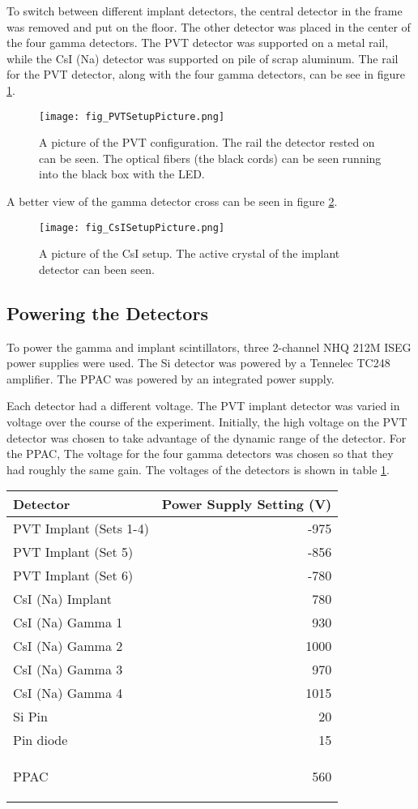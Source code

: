 \documentclass[../MaxHughesThesis.tex]{subfiles}
\begin{document}
To switch between different implant detectors, the central detector in the frame was removed and put on the floor.
The other detector was placed in the center of the four gamma detectors.
The PVT detector was supported on a metal rail, while the CsI (Na) detector was supported on pile of scrap aluminum.
The rail for the PVT detector, along with the four gamma detectors,  can be see in figure \ref{fig:PVTPicture}.

\begin{figure}
	\centerline{\texttt{[image: fig\_PVTSetupPicture.png]}}
	\caption{A picture of the PVT configuration. 
		 The rail the detector rested on can be seen.
		 The optical fibers (the black cords) can be seen running into the black box with the LED.
		 }
	\label{fig:PVTPicture}
\end{figure}
A better view of the gamma detector cross can be seen in figure \ref{fig:CsIPicture}.

\begin{figure}
	\centerline{\texttt{[image: fig\_CsISetupPicture.png]}}
	\caption{A picture of the CsI setup.
		 The active crystal of the implant detector can been seen. 
		 }
	\label{fig:CsIPicture}
\end{figure}

\subsection{Powering the Detectors}

To power the gamma and implant scintillators, three 2-channel NHQ 212M ISEG power supplies were used.
The Si detector was powered by a Tennelec TC248 amplifier.
The PPAC was powered by an integrated power supply.

Each detector had a different voltage. 
The PVT implant detector was varied in voltage over the course of the experiment.
Initially, the high voltage on the PVT detector was chosen to take advantage of the dynamic range of the detector.
For the PPAC, 
The voltage for the four gamma detectors was chosen so that they had roughly the same gain.
The voltages of the detectors is shown in table \ref{tab:detvolt}.
\begin{table}[!hbt]
	\centering
		\begin{tabular}{l|r}
		Detector & Power Supply Setting (V) \\ \hline
		PVT Implant (Sets 1-4) & -975 \\
		PVT Implant (Set 5) & -856 \\
		PVT Implant (Set 6) & -780 \\
		CsI (Na) Implant & 780 \\ 
		CsI (Na) Gamma 1 & 930 \\
		CsI (Na) Gamma 2 & 1000 \\
		CsI (Na) Gamma 3 & 970 \\
		CsI (Na) Gamma 4 & 1015 \\
		Si Pin & 20 \\
		Pin diode & 15 \\
		PPAC & 560  
		
		\label{tab:detvolt}
		\end{tabular}
\end{table}
\end{document}
